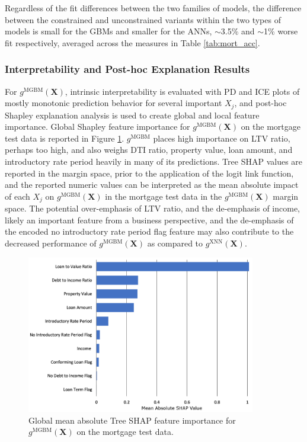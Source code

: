 \documentclass[information,article,submit,moreauthors,pdftex]{definitions/mdpi}
\begin{document}
\noindent Regardless of the fit differences between the two families of models, the difference between the constrained and unconstrained variants within the two types of models is small for the GBMs and smaller for the ANNs, $\sim$3.5\% and $\sim$1\% worse fit respectively, averaged across the measures in Table \ref{tab:mort_acc}.  

\subsubsection{Interpretability and Post-hoc Explanation Results}\label{ssec:int_ex_mort}

For $g^\text{MGBM}(\mathbf{X})$, intrinsic interpretability is evaluated with PD and ICE plots of mostly monotonic prediction behavior for several important $X_j$, and post-hoc Shapley explanation analysis is used to create global and local feature importance. Global Shapley feature importance for $g^\text{MGBM}(\mathbf{X})$ on the mortgage test data is reported in Figure \ref{fig:mort_mgbm_glob}. $g^\text{MGBM}$ places high importance on LTV ratio, perhaps too high, and also weighs DTI ratio, property value, loan amount, and introductory rate period heavily in many of its predictions. Tree SHAP values are reported in the margin space, prior to the application of the logit link function, and the reported numeric values can be interpreted as the mean absolute impact of each $X_j$ on $g^\text{MGBM}(\mathbf{X})$ in the mortgage test data in the $g^\text{MGBM}(\mathbf{X})$ margin space. The potential over-emphasis of LTV ratio, and the de-emphasis of income, likely an important feature from a business perspective, and the de-emphasis of the encoded no introductory rate period flag feature may also contribute to the decreased performance of $g^\text{MGBM}(\mathbf{X})$ as compared to $g^\text{XNN}(\mathbf{X})$.

\begin{figure}[htb]
\centering
\captionsetup{width=17cm}
\includegraphics[width=10cm]{img/mort_mgbm_glob.png}
\caption{Global mean absolute Tree SHAP feature importance for $g^\text{MGBM}(\mathbf{X})$ on the mortgage test data.}
\label{fig:mort_mgbm_glob}
\end{figure} 
\end{document}
